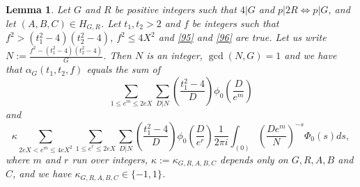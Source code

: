 \documentclass[12pt]{amsart}
\newtheorem{lemma}[theorem]{Lemma}
\theoremstyle{definition}
\numberwithin{equation}{section}
\begin{document}
\begin{lemma}\label{lem:12,9} Let $G$ and $R$ be positive integers such that $
4|G$ and
$p|2R\Leftrightarrow p|G$, and let $\left(A,B,C\right)\in H_{G,R}$. Let $
t_1,t_2>2$ and $f$ be integers such that
$f^2>\left(t_1^2-4\right)\left(t_2^2-4\right)$, $f^2\le 4X^2$ and \eqref{95} and \eqref{96}
are true. Let us write $N:=\frac {f^2-\left(t_1^2-4\right)\left(t_
2^2-4\right)}G$. Then $N$ is
an integer, $\gcd\left(N,G\right)=1$ and we have that $\alpha_G\left
(t_1,t_2,f\right)$ equals the sum of
\[\sum_{1\le e^m\le 2eX}\sum_{D|N}\left(\frac {t_1^2-4}D\right)\phi_
0\left(\frac D{e^m}\right)\]
and
\[\kappa\sum_{2eX<e^m\le 4eX^2}\sum_{1\le e^r\le 2eX}\sum_{D|N}\left
(\frac {t_1^2-4}D\right)\phi_0\left(\frac D{e^r}\right)\frac 1{2\pi
i}\int_{\left(0\right)}\left(\frac {De^m}N\right)^{-s}\Phi_0\left
(s\right)ds,\]
where $m$ and $r$ run over integers, $\kappa :=\kappa_{G,R,A,B,C}$ depends only on $
G,R,A,B$ and $C$, and we have $\kappa_{G,R,A,B,C}\in \{-1,1\}$.
\end{lemma}
\end{document}
